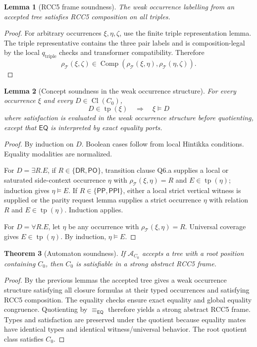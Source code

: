 \documentclass[11pt]{article}
\newtheorem{theorem}{Theorem}[section]
\newtheorem{lemma}[theorem]{Lemma}
\newcommand{\EQ}{\mathsf{EQ}}
\newcommand{\PP}{\mathsf{PP}}
\newcommand{\PPI}{\mathsf{PPI}}
\newcommand{\PO}{\mathsf{PO}}
\newcommand{\DR}{\mathsf{DR}}
\newcommand{\Comp}{\operatorname{Comp}}
\newcommand{\Cl}{\operatorname{Cl}}
\newcommand{\tp}{\operatorname{tp}}
\newcommand{\Aut}{\mathcal A}
\newcommand{\eqE}{\equiv_{\EQ}}
\begin{document}
\begin{lemma}[RCC5 frame soundness]
The weak occurrence labelling from an accepted tree satisfies RCC5 composition on all triples.
\end{lemma}

\begin{proof}
For arbitrary occurrences $\xi,\eta,\zeta$, use the finite triple representation lemma.  The triple representative contains the three pair labels and is composition-legal by the local $q_{\mathrm{triple}}$ checks and transformer compatibility.  Therefore
\[
  \rho_\mathcal T(\xi,\zeta)
  \in
  \Comp(\rho_\mathcal T(\xi,\eta),\rho_\mathcal T(\eta,\zeta)).
\]
\end{proof}

\begin{lemma}[Concept soundness in the weak occurrence structure]
For every occurrence $\xi$ and every $D\in\Cl(C_0)$,
\[
  D\in\tp(\xi)
  \quad\Longrightarrow\quad
  \xi\models D
\]
where satisfaction is evaluated in the weak occurrence structure before quotienting, except that $\EQ$ is interpreted by exact equality ports.
\end{lemma}

\begin{proof}
By induction on $D$.  Boolean cases follow from local Hintikka conditions.  Equality modalities are normalized.

For $D=\exists R.E$, if $R\in\{\DR,\PO\}$, transition clause Q6.a supplies a local or saturated side-context occurrence $\eta$ with $\rho_\mathcal T(\xi,\eta)=R$ and $E\in\tp(\eta)$; induction gives $\eta\models E$.  If $R\in\{\PP,\PPI\}$, either a local strict vertical witness is supplied or the parity request lemma supplies a strict occurrence $\eta$ with relation $R$ and $E\in\tp(\eta)$.  Induction applies.

For $D=\forall R.E$, let $\eta$ be any occurrence with $\rho_\mathcal T(\xi,\eta)=R$.  Universal coverage gives $E\in\tp(\eta)$.  By induction, $\eta\models E$.
\end{proof}

\begin{theorem}[Automaton soundness]
If $\Aut_{C_0}$ accepts a tree with a root position containing $C_0$, then $C_0$ is satisfiable in a strong abstract RCC5 frame.
\end{theorem}

\begin{proof}
By the previous lemmas the accepted tree gives a weak occurrence structure satisfying all closure formulas at their typed occurrences and satisfying RCC5 composition.  The equality checks ensure exact equality and global equality congruence.  Quotienting by $\eqE$ therefore yields a strong abstract RCC5 frame.  Types and satisfaction are preserved under the quotient because equality mates have identical types and identical witness/universal behavior.  The root quotient class satisfies $C_0$.
\end{proof}
\end{document}
